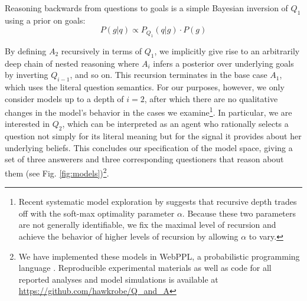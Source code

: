 \documentclass[11pt, floatsintext]{apa6}
\begin{document}
%
Reasoning backwards from questions to goals is a simple Bayesian inversion of $Q_1$ using a prior on goals:
$$
P(g|q) \propto P_{Q_1}(q|g)\cdot P(g)
$$

By defining $A_2$ recursively in terms of $Q_1$, we implicitly give rise to an arbitrarily deep chain of nested reasoning where $A_{i}$ infers a posterior over underlying goals by inverting $Q_{i-1}$, and so on. This recursion terminates in the base case $A_1$, which uses the literal question semantics. For our purposes, however, we only consider models up to a depth of $i=2$, after which there are no qualitative changes in the model's behavior in the cases we examine\footnote{Recent systematic model exploration by  suggests that recursive depth trades off with the soft-max optimality parameter $\alpha$. Because these two parameters are not generally identifiable, we fix the maximal level of recursion and achieve the behavior of higher levels of recursion by allowing $\alpha$ to vary.}. In particular, we are interested in $Q_2$, which can be interpreted as an agent who rationally selects a question not simply for its literal meaning but for the signal it provides about her underlying beliefs. This concludes our specification of the model space, giving a set of three answerers and three corresponding questioners that reason about them (see Fig. \ref{fig:models})\footnote{We have implemented these models in WebPPL, a probabilistic programming language \cite{GoodmanStuhlmuller14_DIPPL}. Reproducible experimental materials as well as code for all reported analyses and model simulations is available at \url{https://github.com/hawkrobe/Q\_and\_A}}.
 

%
\end{document}
